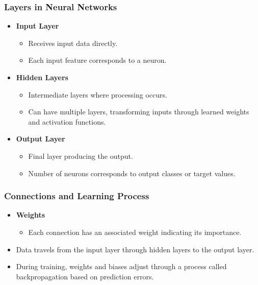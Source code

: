 \documentclass[aspectratio=169]{beamer}
\begin{document}
\begin{frame}[fragile]
    \frametitle{Layers in Neural Networks}
    \begin{itemize}
        \item \textbf{Input Layer}
        \begin{itemize}
            \item Receives input data directly.
            \item Each input feature corresponds to a neuron.
        \end{itemize}
        \item \textbf{Hidden Layers}
        \begin{itemize}
            \item Intermediate layers where processing occurs.
            \item Can have multiple layers, transforming inputs through learned weights and activation functions.
        \end{itemize}
        \item \textbf{Output Layer}
        \begin{itemize}
            \item Final layer producing the output.
            \item Number of neurons corresponds to output classes or target values.
        \end{itemize}
    \end{itemize}
\end{frame}

\begin{frame}[fragile]
    \frametitle{Connections and Learning Process}
    \begin{itemize}
        \item \textbf{Weights}
        \begin{itemize}
            \item Each connection has an associated weight indicating its importance.
        \end{itemize}
        \item Data travels from the input layer through hidden layers to the output layer.
        \item During training, weights and biases adjust through a process called backpropagation based on prediction errors.
    \end{itemize}
\end{frame}
\end{document}
